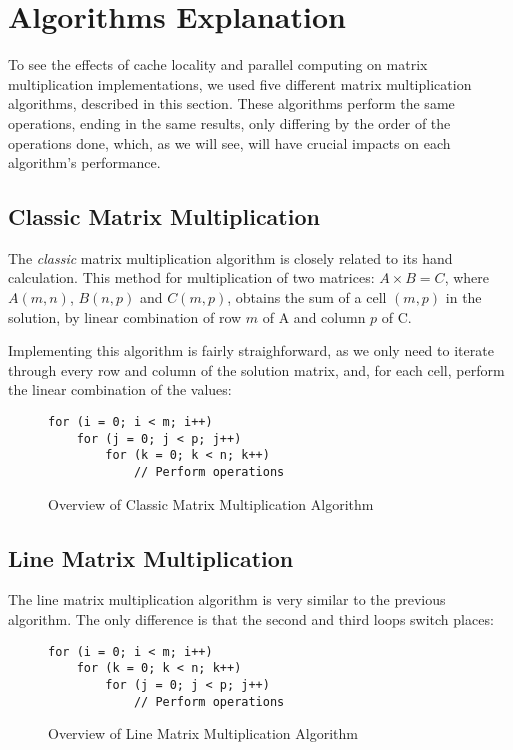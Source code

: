 \section{Algorithms Explanation} \label{section:algorithms}

To see the effects of cache locality and parallel computing on matrix multiplication implementations, we used five different matrix multiplication algorithms, described in this section. These algorithms perform the same operations, ending in the same results, only differing by the order of the operations done, which, as we will see, will have crucial impacts on each algorithm's performance.

\subsection{Classic Matrix Multiplication}

The \textit{classic} matrix multiplication algorithm is closely related to its hand calculation. This method for multiplication of two matrices: $A \times B = C$, where $A(m, n)$, $B(n, p)$ and $C(m, p)$, obtains the sum of a cell $(m,p)$ in the solution, by linear combination of row $m$ of A and column $p$ of C.

Implementing this algorithm is fairly straighforward, as we only need to iterate through every row and column of the solution matrix, and, for each cell, perform the linear combination of the values:

\begin{figure}[h!]
\begin{verbatim}
for (i = 0; i < m; i++)
    for (j = 0; j < p; j++)
        for (k = 0; k < n; k++)
            // Perform operations
\end{verbatim}
\caption{Overview of Classic Matrix Multiplication Algorithm}
\label{fig:algo:classic}
\end{figure}

    
\subsection{Line Matrix Multiplication}

The line matrix multiplication algorithm is very similar to the previous algorithm. The only difference is that the second and third loops switch places:

\begin{figure}[h!]
\begin{verbatim}
for (i = 0; i < m; i++)
    for (k = 0; k < n; k++)
        for (j = 0; j < p; j++)
            // Perform operations
\end{verbatim}
\caption{Overview of Line Matrix Multiplication Algorithm}
\label{fig:algo:line}
\end{figure}

